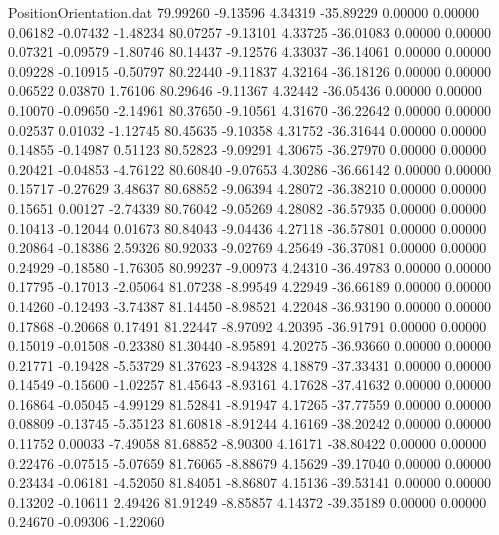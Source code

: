 \begin{filecontents}{PositionOrientation.dat}
  79.99260   -9.13596    4.34319   -35.89229    0.00000    0.00000    0.06182   -0.07432   -1.48234
  80.07257   -9.13101    4.33725   -36.01083    0.00000    0.00000    0.07321   -0.09579   -1.80746
  80.14437   -9.12576    4.33037   -36.14061    0.00000    0.00000    0.09228   -0.10915   -0.50797
  80.22440   -9.11837    4.32164   -36.18126    0.00000    0.00000    0.06522    0.03870    1.76106
  80.29646   -9.11367    4.32442   -36.05436    0.00000    0.00000    0.10070   -0.09650   -2.14961
  80.37650   -9.10561    4.31670   -36.22642    0.00000    0.00000    0.02537    0.01032   -1.12745
  80.45635   -9.10358    4.31752   -36.31644    0.00000    0.00000    0.14855   -0.14987    0.51123
  80.52823   -9.09291    4.30675   -36.27970    0.00000    0.00000    0.20421   -0.04853   -4.76122
  80.60840   -9.07653    4.30286   -36.66142    0.00000    0.00000    0.15717   -0.27629    3.48637
  80.68852   -9.06394    4.28072   -36.38210    0.00000    0.00000    0.15651    0.00127   -2.74339
  80.76042   -9.05269    4.28082   -36.57935    0.00000    0.00000    0.10413   -0.12044    0.01673
  80.84043   -9.04436    4.27118   -36.57801    0.00000    0.00000    0.20864   -0.18386    2.59326
  80.92033   -9.02769    4.25649   -36.37081    0.00000    0.00000    0.24929   -0.18580   -1.76305
  80.99237   -9.00973    4.24310   -36.49783    0.00000    0.00000    0.17795   -0.17013   -2.05064
  81.07238   -8.99549    4.22949   -36.66189    0.00000    0.00000    0.14260   -0.12493   -3.74387
  81.14450   -8.98521    4.22048   -36.93190    0.00000    0.00000    0.17868   -0.20668    0.17491
  81.22447   -8.97092    4.20395   -36.91791    0.00000    0.00000    0.15019   -0.01508   -0.23380
  81.30440   -8.95891    4.20275   -36.93660    0.00000    0.00000    0.21771   -0.19428   -5.53729
  81.37623   -8.94328    4.18879   -37.33431    0.00000    0.00000    0.14549   -0.15600   -1.02257
  81.45643   -8.93161    4.17628   -37.41632    0.00000    0.00000    0.16864   -0.05045   -4.99129
  81.52841   -8.91947    4.17265   -37.77559    0.00000    0.00000    0.08809   -0.13745   -5.35123
  81.60818   -8.91244    4.16169   -38.20242    0.00000    0.00000    0.11752    0.00033   -7.49058
  81.68852   -8.90300    4.16171   -38.80422    0.00000    0.00000    0.22476   -0.07515   -5.07659
  81.76065   -8.88679    4.15629   -39.17040    0.00000    0.00000    0.23434   -0.06181   -4.52050
  81.84051   -8.86807    4.15136   -39.53141    0.00000    0.00000    0.13202   -0.10611    2.49426
  81.91249   -8.85857    4.14372   -39.35189    0.00000    0.00000    0.24670   -0.09306   -1.22060

\end{filecontents}
